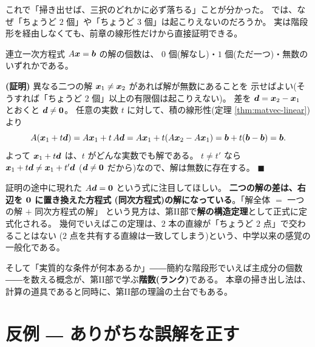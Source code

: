 これで「掃き出せば、三択のどれかに必ず落ちる」ことが分かった。
では、なぜ「ちょうど $2$ 個」や「ちょうど $3$ 個」は起こりえないのだろうか。
実は階段形を経由しなくても、前章の線形性だけから直接証明できる。

\begin{teiri}[解の個数は三択である]\label{thm:threesol}
連立一次方程式 $A\bm{x} = \bm{b}$ の解の個数は、
$0$ 個(解なし)・$1$ 個(ただ一つ)・無数のいずれかである。
\end{teiri}

\noindent\textbf{(証明)}\quad
異なる二つの解 $\bm{x}_1 \neq \bm{x}_2$ があれば解が無数にあることを
示せばよい(そうすれば「ちょうど $2$ 個」以上の有限個は起こりえない)。
差を $\bm{d} = \bm{x}_2 - \bm{x}_1$ とおくと $\bm{d} \neq \bm{0}$。
任意の実数 $t$ に対して、積の線形性(定理 \ref{thm:matvec-linear})より
\[
A(\bm{x}_1 + t\bm{d})
= A\bm{x}_1 + t\,A\bm{d}
= A\bm{x}_1 + t(A\bm{x}_2 - A\bm{x}_1)
= \bm{b} + t(\bm{b} - \bm{b}) = \bm{b}.
\]
よって $\bm{x}_1 + t\bm{d}$ は、$t$ がどんな実数でも解である。
$t \neq t'$ なら $\bm{x}_1 + t\bm{d} \neq \bm{x}_1 + t'\bm{d}$
($\bm{d} \neq \bm{0}$ だから)なので、解は無数に存在する。 $\blacksquare$

証明の途中に現れた $A\bm{d} = \bm{0}$ という式に注目してほしい。
\textbf{二つの解の差は、右辺を $\bm{0}$ に置き換えた方程式
(同次方程式)の解になっている}。「解全体 $=$ 一つの解 $+$ 同次方程式の解」
という見方は、第II部で\textbf{解の構造定理}として正式に定式化される。
幾何でいえばこの定理は、$2$ 本の直線が「ちょうど $2$ 点」で交わることはない
($2$ 点を共有する直線は一致してしまう)という、中学以来の感覚の一般化である。

そして「実質的な条件が何本あるか」――簡約な階段形でいえば主成分の個数
――を数える概念が、第II部で学ぶ\textbf{階数(ランク)}である。
本章の掃き出し法は、計算の道具であると同時に、第II部の理論の土台でもある。

\section{反例 ― ありがちな誤解を正す}

